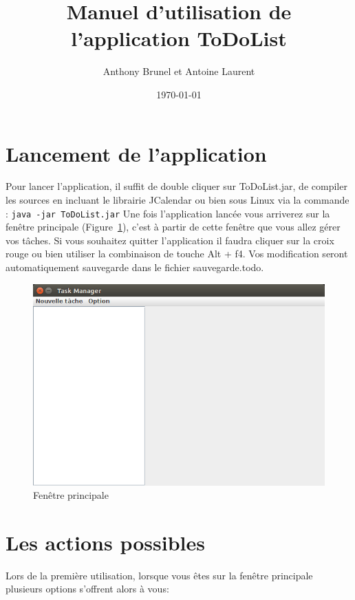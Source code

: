 \documentclass{article}
\title{Manuel d'utilisation de l'application ToDoList}
\author{Anthony Brunel et Antoine Laurent}
\date{\today}
\begin{document}
\maketitle
\newpage
\tableofcontents
\listoffigures
\newpage

\section{Lancement de l'application}
Pour lancer l'application, il suffit de double cliquer sur ToDoList.jar, de compiler les sources en incluant le librairie JCalendar ou bien sous Linux via la commande : \verb+java -jar ToDoList.jar+
\newline
\newline
Une fois l'application lancée vous arriverez sur la fenêtre principale (Figure~\ref{Fenêtre principale}), c'est à partir de cette fenêtre que vous allez gérer vos tâches. 
\newline
Si vous souhaitez quitter l'application il faudra cliquer sur la croix rouge ou bien utiliser la combinaison de touche Alt + f4. Vos modification seront automatiquement sauvegarde dans le fichier sauvegarde.todo.

\begin{figure}[h]
	\centering
	\includegraphics[scale=0.34]{images/MainDIsplay.png}
	\caption{Fenêtre principale}
	\label{Fenêtre principale}
\end{figure}

\section{Les actions possibles}
Lors de la première utilisation, lorsque vous êtes sur la fenêtre principale plusieurs options s'offrent alors à vous:
\newline
\end{document}
